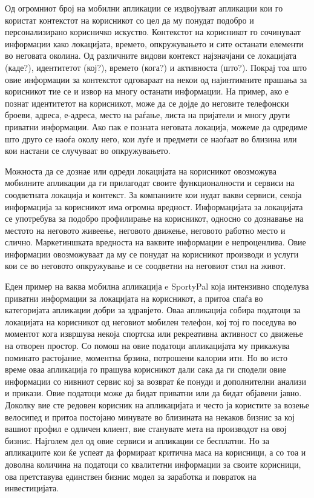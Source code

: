 \documentclass[12pt,a4paper]{article}
\begin{document}
Од огромниот број на мобилни апликации се издвојуваат апликации кои го користат
контекстот на корисникот со цел да му понудат подобро и персонализирано
корисничко искуство. Контекстот на корисникот го сочинуваат информации како
локацијата, времето, опкружувањето и сите останати елементи во неговата
околина. Од различните видови контекст најзначјани се локацијата (каде?), идентитетот
(кој?), времето (кога?) и активноста (што?). Покрај тоа што овие информации за
контекстот одговараат на некои од најинтимните прашања за корисникот тие се и
извор на многу останати информации. На пример, ако е познат
идентитетот на корисникот, може да се дојде до неговите телефонски броеви,
адреса, е-адреса, место на раѓање, листа на пријатели и многу други приватни
информации. Ако пак е позната неговата локација, можеме да одредиме што друго се
наоѓа околу него, кои луѓе и предмети се наоѓаат во близина или кои настани се
случуваат во опкружувањето.

Можноста да се дознае или одреди локацијата на корисникот овозможува мобилните
апликации да ги прилагодат своите функционалности и сервиси на соодветната
локација и контекст. За компаниите кои нудат вакви сервиси, секоја информација
за корисникот има огромна вредност. Информацијата за локацијата се употребува за
подобро профилирање на корисникот, односно со дознавање на местото на неговото
живеење, неговото движење, неговото работно место и слично. Маркетиншката
вредноста на ваквите информации е непроценлива. Овие информации овозможуваат да
му се понудат на корисникот производи и услуги кои се во неговото опкружување и
се соодветни на неговиот стил на живот.

Еден пример на ваква мобилна апликација e SportyPal \cite{sportypal} која
интензивно споделува приватни информации за локацијата на корисникот, а притоа спаѓа во категоријата апликации добри за здравјето. Оваа апликација собира
податоци за локацијата на корисникот од неговиот мобилен телефон, кој тој го
поседува во моментот кога извршува некоја спортска или рекреативна активност со
движење на отворен простор. Со помош на овие податоци апликацијата му прикажува
поминато растојание, моментна брзина, потрошени калории итн. Но во исто време
оваа апликација го прашува корисникот дали сака да ги сподели овие информации со
нивниот сервис кој за возврат ќе понуди и дополнителни анализи и прикази. Овие
податоци може да бидат приватни или да бидат објавени јавно. Доколку вие
сте редовен корисник на апликацијата и често ја користите за возење велосипед и
притоа постојано минувате во близината на некаков бизнис за кој вашиот профил е
одличен клиент, вие станувате мета на производот на овој бизнис. Најголем дел од
овие сервиси и апликации се бесплатни. Но за апликациите кои ќе успеат да
формираат критична маса на корисници, а со тоа и доволна количина на податоци со
квалитетни информации за своите корисници, ова претставува единствен бизнис
модел за заработка и повраток на инвестицијата.
\end{document}
